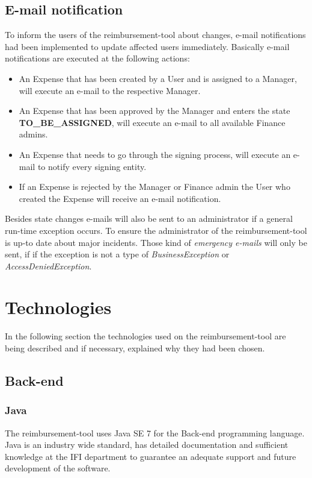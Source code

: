 \subsection{E-mail notification}
To inform the users of the reimbursement-tool about changes, e-mail notifications had been implemented to update affected users immediately. Basically e-mail notifications are executed at the following actions:
\begin{itemize}
\item An Expense that has been created by a User and is assigned to a Manager, will execute an e-mail to the respective Manager.
\item An Expense that has been approved by the Manager and enters the state \newline \textbf{TO\_BE\_ASSIGNED}, will execute an e-mail to all available Finance admins.
\item An Expense that needs to go through the signing process, will execute an e-mail to notify every signing entity.
\item If an Expense is rejected by the Manager or Finance admin the User who created the Expense will receive an e-mail notification.
\end{itemize}

Besides state changes e-mails will also be sent to an administrator if a general run-time exception occurs. To ensure the administrator of the reimbursement-tool is up-to date about major incidents. Those kind of \textit{emergency e-mails} will only be sent, if if the exception is not a type of \textit{BusinessException} or \textit{AccessDeniedException}. 
    

\section{Technologies}

In the following section the technologies used on the reimbursement-tool are being described and if necessary, explained why they had been chosen. 

\subsection{Back-end}

\subsubsection{Java}
The reimbursement-tool uses Java SE 7 for the Back-end programming language. Java is an industry wide standard, has detailed documentation and sufficient knowledge at the IFI \cite{ifi} department to guarantee an adequate support and future development of the software.

